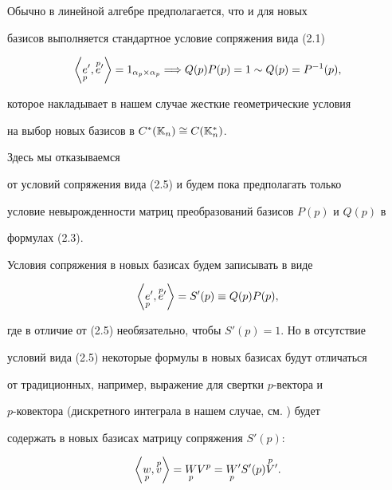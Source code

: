  


Обычно в линейной алгебре предполагается, что и для новых 


базисов выполняется стандартное условие сопряжения вида (2.1) 


\begin{equation} 


\left\langle\down{p}{e}',\up{p}{e}'\right\rangle= 


1_{\alpha_p\times\alpha_p}\Longrightarrow Q(p)P(p)=1\sim 


Q(p)=P^{-1}(p), 


\end{equation} 


которое накладывает в нашем случае жесткие геометрические условия 


на выбор новых базисов в $C^*(\Bbb K_n)\cong C(\Bbb K^*_n)$. 


Здесь мы отказываемся 


от условий сопряжения вида (2.5) и будем пока предполагать только 


условие невырожденности матриц преобразований базисов $P(p)$ и $Q(p)$ в 


формулах (2.3). 


 


Условия сопряжения в новых базисах будем записывать в виде 


\begin{equation} 


\left\langle\down{p}{e}',\up{p}{e}' \right\rangle 


=S'(p)\equiv Q(p)P(p), 


\end{equation} 


где в отличие от (2.5) необязательно, чтобы $S'(p)=1$. Но в отсутствие 


условий вида (2.5) некоторые формулы в новых базисах будут отличаться 


от традиционных, например, выражение для свертки $p$-вектора и 


$p$-ковектора (дискретного интеграла в нашем случае, см. \cite{Yak1}) будет 


содержать в новых базисах матрицу сопряжения $S'(p)$: 


$$ 


\left\langle\down{p}{w},\up{p}{v}\right\rangle= 


\down{p}{W}V^p=\down{p}{W}'S'(p)\up{p}{V}'. 


$$ 



